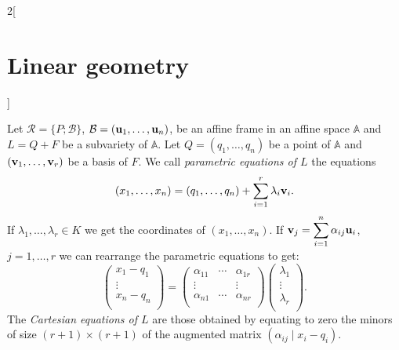 \documentclass[../../../main.tex]{subfiles}
\begin{document}
\begin{multicols}{2}[\section{Linear geometry}]
\begin{definition}
    \end{definition}
    \begin{definition}
        Let $\mathcal{R}=\{P;\mathcal{B}\}$, $\mathcal{B}=(\vb{u}_1,\ldots,\vb{u}_n)$, be an affine frame in an affine space $\mathbb{A}$ and $L=Q+F$ be a subvariety of $\mathbb{A}$. Let $Q=(q_1,\ldots,q_n)$ be a point of $\mathbb{A}$ and $(\vb{v}_1,\ldots,\vb{v}_r)$ be a basis of $F$. We call \textit{parametric equations of $L$} the equations $$(x_1,\ldots,x_n)=(q_1,\ldots,q_n)+\sum_{i=1}^r\lambda_i\vb{v}_i.$$ If $\lambda_1,\ldots,\lambda_r\in K$ we get the coordinates of $(x_1,\ldots,x_n)$. If $\displaystyle \vb{v}_j=\sum_{i=1}^n\alpha_{ij}\vb{u}_i$, $j=1,\ldots,r$ we can rearrange the parametric equations to get: $$\begin{pmatrix}
                x_1-q_1 \\
                \vdots  \\
                x_n-q_n \\
            \end{pmatrix}=\begin{pmatrix}
                \alpha_{11} & \cdots & \alpha_{1r} \\
                \vdots      &        & \vdots      \\
                \alpha_{n1} & \cdots & \alpha_{nr} \\
            \end{pmatrix}\begin{pmatrix}
                \lambda_1 \\
                \vdots    \\
                \lambda_r \\
            \end{pmatrix}.$$ The \textit{Cartesian equations of $L$} are those obtained by equating to zero the minors of size $(r+1)\times(r+1)$ of the augmented matrix $\left(\alpha_{ij}\mid x_i-q_i\right)$.
    \end{definition}

\end{multicols}
\end{document}
